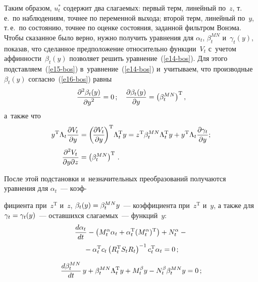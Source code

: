 \begin{multicols}{2}
     Таким образом, $u_t^*$ содержит два слагаемых: первый терм, 
линейный по~$z$, т.\,е.\ по наблюдениям, точнее по переменной выхода; 
второй терм, линейный по~$y$, т.\,е.\ по состоянию, точнее по оценке 
состояния, заданной фильтром Вонэма. Чтобы сказанное было верно, нужно 
получить уравнения для $\alpha_t$, $\beta_t^{MN}$ и~$\gamma_t(y)$, 
показав, что сделанное предположение относительно функции~$V_t$ 
с~учетом аффинности~$\beta_t(y)$ позволяет решить  
уравнение~(\ref{e14-bos}). Для этого подставляем~(\ref{e15-bos}) 
в~уравнение~(\ref{e14-bos}) и~учитываем, что производные~$\beta_t(y)$ 
согласно~(\ref{e16-bos}) равны 
$$
\displaystyle\frac{\displaystyle \partial^2 \beta_t(y)\mathstrut}{\displaystyle \partial y^2\mathstrut}=0\,;\quad 
\displaystyle\frac{\displaystyle \partial \beta_t(y)\mathstrut}{\displaystyle \partial y\mathstrut}= \left(\beta_t^{MN}\right)^{\mathrm{T}},
$$
 а~также что
     \begin{align*}
     y^{\mathrm{T}} \Lambda_t \displaystyle\frac{\displaystyle \partial V_t\mathstrut}{\displaystyle \partial y\mathstrut}&=\left(\! \displaystyle\frac{\displaystyle \partial V_t\mathstrut}{\displaystyle \partial 
y\mathstrut}\!\right)^{\mathrm{T}}\! \Lambda_t^{\mathrm{T}} y= z^{\mathrm{T}} \beta_t^{MN} \Lambda_t^{\mathrm{T}} y+ y^{\mathrm{T}} \Lambda_t 
\displaystyle\frac{\displaystyle \partial \gamma_t\mathstrut}{\displaystyle \partial y\mathstrut};
   \\[3pt]
     \displaystyle\frac{\displaystyle \partial^2 V_t\mathstrut}{\displaystyle \partial y\partial z\mathstrut} &=\left( \beta_t^{MN}\right)^{\mathrm{T}}\,.
    \end{align*}
     
     После этой подстановки и~незначительных преобразований получаются 
уравнения для $\alpha_t$~--- коэф-\linebreak\vspace*{-12pt}

\columnbreak

\noindent
фициента при~$z^{\mathrm{T}}$ и~$z$, $\beta_t(y)\hm= 
\beta_t^{MN} y$~--- коэффициента при~$z^{\mathrm{T}}$ и~$y$, а также для 
$\gamma_t\hm= \gamma_t(y)$~--- оставшихся слагаемых~--- функций~$y$:
     \begin{multline}
     \displaystyle\frac{\displaystyle d\alpha_t\mathstrut}{\displaystyle dt\mathstrut}-\left( M_t^\alpha \alpha_t +\alpha_t^{\mathrm{T}} 
(M_t^\alpha)^{\mathrm{T}}\right) +N_t^\alpha -{}\\
{}-\alpha_t^{\mathrm{T}} c_t \left(R_t^{\mathrm{T}} S_t R_t\right)^{-1} 
c_t^{\mathrm{T}} \alpha_t =0\,;\label{e19-bos}
\end{multline}

\noindent
\begin{equation}
     \displaystyle\frac{\displaystyle d\beta_t^{MN}\mathstrut}{\displaystyle dt\mathstrut}\,y +\beta_t^{MN}\Lambda_t^{\mathrm{T}} y+M_t^\beta y- 
N_t^\beta \beta_t^{MN} y=0\,;\label{e20-bos}
\end{equation}


\end{multicols}
